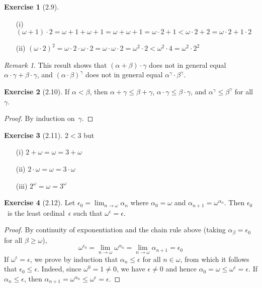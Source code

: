 \documentclass[letterpaper,12pt]{article}
\newcommand{\mult}{\cdot}
\theoremstyle{definition}
\newtheorem*{exer}{Exercise}
\theoremstyle{remark}
\newtheorem*{rmk}{Remark}
\begin{document}
\begin{exer}[2.9]\
\begin{enumerate}[itemsep=0pt]
\item[(i)] \((\omega+1)\mult 2=\omega+1+\omega+1=\omega+\omega+1=\omega\mult 2+1<\omega\mult 2+2=\omega\mult 2+1\mult 2\)
\item[(ii)] \((\omega\mult 2)^2=\omega\mult 2\mult\omega\mult 2=\omega\mult\omega\mult 2=\omega^2\mult 2<\omega^2\mult 4=\omega^2\mult 2^2\)
\end{enumerate}
\end{exer}
\begin{rmk}
This result shows that \((\alpha+\beta)\mult\gamma\) does not in general equal \(\alpha\mult\gamma+\beta\mult\gamma\), and \((\alpha\mult\beta)^{\gamma}\) does not in general equal \(\alpha^{\gamma}\mult\beta^{\gamma}\).
\end{rmk}

\begin{exer}[2.10]
If \(\alpha<\beta\), then \(\alpha+\gamma\le\beta+\gamma\), \(\alpha\mult\gamma\le\beta\mult\gamma\), and \(\alpha^{\gamma}\le\beta^{\gamma}\) for all~\(\gamma\).
\end{exer}
\begin{proof}
By induction on~\(\gamma\).
\end{proof}

\begin{exer}[2.11]
\(2<3\) but
\begin{enumerate}[itemsep=0pt]
\item[(i)] \(2+\omega=\omega=3+\omega\)
\item[(ii)] \(2\mult\omega=\omega=3\mult\omega\)
\item[(iii)] \(2^{\omega}=\omega=3^{\omega}\)
\end{enumerate}
\end{exer}

\begin{exer}[2.12]
Let \(\epsilon_0=\lim_{n\to\omega}\alpha_n\) where \(\alpha_0=\omega\) and \(\alpha_{n+1}=\omega^{\alpha_n}\). Then \(\epsilon_0\)~is the least ordinal~\(\epsilon\) such that \(\omega^{\epsilon}=\epsilon\).
\end{exer}
\begin{proof}
By continuity of exponentiation and the chain rule above (taking \(\alpha_{\beta}=\epsilon_0\) for all \(\beta\ge\omega\)),
\[\omega^{\epsilon_0}=\lim_{n\to\omega}\omega^{\alpha_n}=\lim_{n\to\omega}\alpha_{n+1}=\epsilon_0\]
If \(\omega^{\epsilon}=\epsilon\), we prove by induction that \(\alpha_n\le\epsilon\) for all \(n\in\omega\), from which it follows that \(\epsilon_0\le\epsilon\). Indeed, since \(\omega^0=1\ne0\), we have \(\epsilon\ne 0\) and hence \(\alpha_0=\omega\le\omega^{\epsilon}=\epsilon\). If \(\alpha_n\le\epsilon\), then \(\alpha_{n+1}=\omega^{\alpha_n}\le\omega^{\epsilon}=\epsilon\).
\end{proof}
\end{document}
